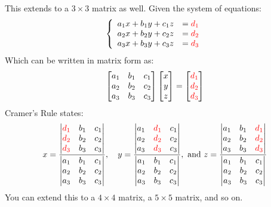 \documentclass{article}
\theoremstyle{mytheoremstyle}
\theoremstyle{mytheoremstyle}
\theoremstyle{myproblemstyle}
\theoremstyle{break}
\begin{document}
		This extends to a $3 \times 3$ matrix as well. Given the system of equations:
		\begin{equation}
			\left.\left\{\begin{array}{ll}a_1x+b_1y+c_1z&=\color{red}{d_1}\\a_2x+b_2y+c_2z&=\color{red}{d_2}\\a_3x+b_3y+c_3z&=\color{red}{d_3}\end{array}\right.\right.
		\end{equation}
		Which can be written in matrix form as:
		\begin{equation}
			\begin{bmatrix}a_1&b_1&c_1\\a_2&b_2&c_2\\a_3&b_3&c_3\end{bmatrix}\begin{bmatrix}x\\y\\z\end{bmatrix}=\begin{bmatrix}\color{red}{d_1}\\\color{red}{d_2}\\\color{red}{d_3}\end{bmatrix}
		\end{equation}
		Cramer's Rule states:
		\begin{equation}
			x=\frac{\begin{vmatrix}\color{red}{d_1}&b_1&c_1\\\color{red}{d_2}&b_2&c_2\\\color{red}{d_3}&b_3&c_3\end{vmatrix}}{\begin{vmatrix}a_1&b_1&c_1\\a_2&b_2&c_2\\a_3&b_3&c_3\end{vmatrix}},\quad y=\frac{\begin{vmatrix}a_1&\color{red}{d_1}&c_1\\a_2&\color{red}{d_2}&c_2\\a_3&\color{red}{d_3}&c_3\end{vmatrix}}{\begin{vmatrix}a_1&b_1&c_1\\a_2&b_2&c_2\\a_3&b_3&c_3\end{vmatrix}},\mathrm{~and~}z=\frac{\begin{vmatrix}a_1&b_1&\color{red}{d_1}\\a_2&b_2&\color{red}{d_2}\\a_3&b_3&\color{red}{d_3}\end{vmatrix}}{\begin{vmatrix}a_1&b_1&c_1\\a_2&b_2&c_2\\a_3&b_3&c_3\end{vmatrix}}
		\end{equation}
		You can extend this to a $4 \times 4$ matrix, a $5 \times 5$ matrix, and so on.
		\newpage
\end{document}
